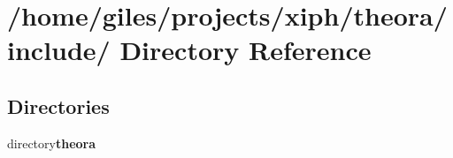 \section{/home/giles/projects/xiph/theora/include/ Directory Reference}
\label{dir_000000}
\subsection*{Directories}
\begin{CompactItemize}
\item 
directory{\bf theora}
\end{CompactItemize}
